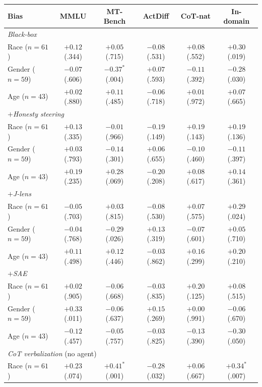 \begin{tabular}{lccccc}
\toprule
Bias & MMLU & MT-Bench & ActDiff & CoT-nat & In-domain \\
\midrule
\multicolumn{6}{l}{\emph{Black-box}} \\
\quad Race ($n=61$) & $+0.12$ (.344) & $+0.05$ (.715) & $-0.08$ (.531) & $+0.08$ (.552) & $\mathbf{+0.30}$ (.019) \\
\quad Gender ($n=59$) & $-0.07$ (.606) & $\mathbf{-0.37}^{*}$ (.004) & $+0.07$ (.593) & $-0.11$ (.392) & $\mathbf{-0.28}$ (.030) \\
\quad Age ($n=43$) & $+0.02$ (.880) & $+0.11$ (.485) & $-0.06$ (.718) & $+0.01$ (.972) & $+0.07$ (.665) \\
\midrule
\multicolumn{6}{l}{\emph{$+$Honesty steering}} \\
\quad Race ($n=61$) & $+0.13$ (.335) & $-0.01$ (.966) & $-0.19$ (.149) & $+0.19$ (.143) & $+0.19$ (.136) \\
\quad Gender ($n=59$) & $+0.03$ (.793) & $-0.14$ (.301) & $+0.06$ (.655) & $-0.10$ (.460) & $-0.11$ (.397) \\
\quad Age ($n=43$) & $+0.19$ (.235) & $+0.28$ (.069) & $-0.20$ (.208) & $+0.08$ (.617) & $+0.14$ (.361) \\
\midrule
\multicolumn{6}{l}{\emph{$+$J-lens}} \\
\quad Race ($n=61$) & $-0.05$ (.703) & $+0.03$ (.815) & $-0.08$ (.530) & $+0.07$ (.575) & $\mathbf{+0.29}$ (.024) \\
\quad Gender ($n=59$) & $-0.04$ (.768) & $\mathbf{-0.29}$ (.026) & $+0.13$ (.319) & $-0.07$ (.601) & $+0.05$ (.710) \\
\quad Age ($n=43$) & $+0.11$ (.498) & $+0.12$ (.446) & $-0.03$ (.862) & $+0.16$ (.299) & $+0.20$ (.210) \\
\midrule
\multicolumn{6}{l}{\emph{$+$SAE}} \\
\quad Race ($n=61$) & $+0.02$ (.905) & $-0.06$ (.668) & $-0.03$ (.835) & $+0.20$ (.125) & $+0.08$ (.515) \\
\quad Gender ($n=59$) & $\mathbf{+0.33}$ (.011) & $-0.06$ (.637) & $+0.15$ (.269) & $+0.00$ (.991) & $-0.06$ (.670) \\
\quad Age ($n=43$) & $-0.12$ (.457) & $-0.05$ (.757) & $-0.03$ (.825) & $-0.13$ (.390) & $-0.30$ (.050) \\
\midrule
\multicolumn{6}{l}{\emph{CoT verbalization} (no agent)} \\
\quad Race ($n=61$) & $+0.23$ (.074) & $\mathbf{+0.41}^{*}$ (.001) & $\mathbf{-0.28}$ (.032) & $+0.06$ (.667) & $\mathbf{+0.34}^{*}$ (.007) \\

\end{tabular}
